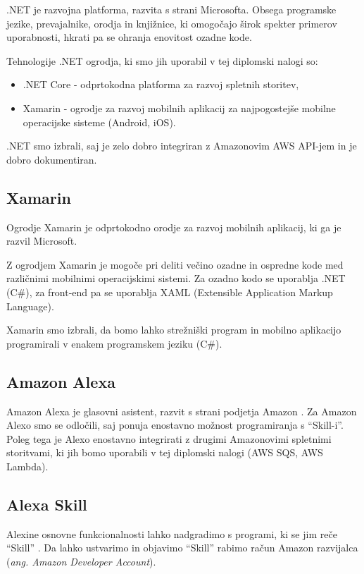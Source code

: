 \documentclass[a4paper, 12pt]{book}
\begin{document}
.NET \cite{dotnet} je razvojna platforma, razvita s strani Microsofta.
Obsega programske jezike, prevajalnike, orodja in knjižnice, ki omogočajo širok spekter primerov uporabnosti, hkrati pa se ohranja enovitost ozadne kode.

Tehnologije .NET ogrodja, ki smo jih uporabil v tej diplomski nalogi so:
\begin{itemize}
	\item .NET Core - odprtokodna platforma za razvoj spletnih storitev,
	\item Xamarin - ogrodje za razvoj mobilnih aplikacij za najpogostejše mobilne operacijske sisteme (Android, iOS).
\end{itemize}

.NET smo izbrali, saj je zelo dobro integriran z Amazonovim AWS API-jem in je dobro dokumentiran.

\subsection{Xamarin}

Ogrodje Xamarin \cite{xamarin} je odprtokodno orodje za razvoj mobilnih aplikacij, ki ga je razvil Microsoft. 

Z ogrodjem Xamarin je mogoče pri deliti večino ozadne in ospredne kode med različnimi mobilnimi operacijskimi sistemi. 
Za ozadno kodo se uporablja .NET (C\#), za front-end pa se uporablja XAML (Extensible Application Markup Language).

Xamarin smo izbrali, da bomo lahko strežniški program in mobilno aplikacijo programirali v enakem programskem jeziku (C\#).

\subsection{Amazon Alexa}

Amazon Alexa je glasovni asistent, razvit s strani podjetja Amazon \cite{alexa}.
Za Amazon Alexo smo se odločili, saj ponuja enostavno možnost programiranja s \enquote{Skill-i}.
Poleg tega je Alexo enostavno integrirati z drugimi Amazonovimi spletnimi storitvami, ki jih bomo uporabili v tej diplomski nalogi (AWS SQS, AWS Lambda).

\subsection{Alexa Skill}

Alexine osnovne funkcionalnosti lahko nadgradimo s programi, ki se jim reče \enquote{Skill} \cite{alexaskills}.
Da lahko ustvarimo in objavimo \enquote{Skill} rabimo račun Amazon razvijalca (\textit{ang. Amazon Developer Account}).
\end{document}
